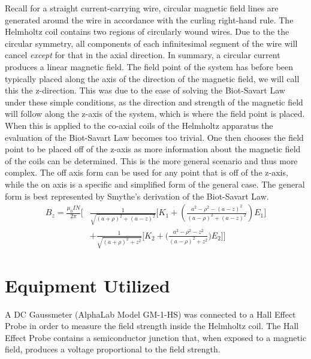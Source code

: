 \documentclass[a4paper]{article}
\begin{document}
Recall for a straight current-carrying wire, circular magnetic field lines are generated around the wire in accordance with the curling right-hand rule. The Helmholtz coil contains two regions of circularly wound wires. Due to the the circular symmetry, all components of each infinitesimal segment of the wire will cancel \textit{except} for that in the axial direction. In summary, a circular current produces a linear magnetic field.
The field point of the system has before been typically placed along the axis of the direction of the magnetic field, we will call this the z-direction. This was due to the ease of solving the Biot-Savart Law under these simple conditions, as the direction and strength of the magnetic field will follow along the z-axis of the system, which is where the field point is placed. When this is applied to the co-axial coils of the Helmholtz apparatus the evaluation of the Biot-Savart Law becomes too trivial. One then chooses the field point to be placed off of the z-axis as more information about the magnetic field of the coils can be determined. This is the more general scenario and thus more complex. The off axis form can be used for any point that is off of the z-axis, while the on axis is a specific and simplified form of the general case. The general form is best represented by Smythe's derivation of the Biot-Savart Law. 
\begin{align*} 
B_z = \frac{\mu_0IN}{2\pi}
\Big[&
    \frac{1}{\sqrt{(a+\rho)^2 + (a-z)^2}}
    \big[
        K_1 + \left(\frac{a^2 -\rho^2 - (a - z)^2}{(a-\rho)^2 + (a - z)^2} \right) E_1 
    \big]\\
    & + \frac{1}{\sqrt{(a + \rho)^2 + z^2}}
    \big[
        K_2 + \big(\frac{a^2 - \rho^2 - z^2}{(a - \rho)^2 + z^2}\big) E_2 
    \big] 
\Big]
\end{align*}
\section{Equipment Utilized}

A DC Gaussmeter (AlphaLab Model GM-1-HS) was connected to a Hall Effect Probe in order to measure the field strength inside the Helmholtz coil. The Hall Effect Probe contains a semiconductor junction that, when exposed to a magnetic field, produces a voltage proportional to the field strength.
\end{document}
